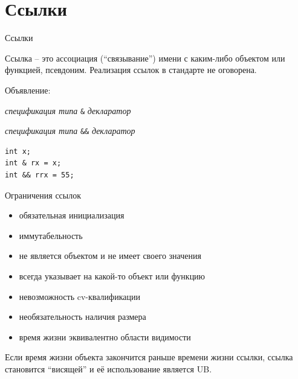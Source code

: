 \documentclass[unknownkeysallowed,xcolor=table]{beamer}
\begin{document}

\section{Ссылки}

\begin{frame}[fragile]{Ссылки}

Ссылка -- это ассоциация (``связывание'') имени с каким-либо объектом или функцией, псевдоним.
Реализация ссылок в стандарте не оговорена.

\vspace{2em}

Объявление:

\vspace{0.7em}

\emph{спецификация типа} \lstinline{&} \emph{декларатор}

\vspace{0.5em}

\emph{спецификация типа} \lstinline{&&} \emph{декларатор}

\vspace{1em}

\begin{lstlisting}
int x;
int & rx = x;
int && rrx = 55;
\end{lstlisting}

\end{frame}

\begin{frame}[fragile]{Ограничения ссылок}

\begin{itemize}
  \item обязательная инициализация \vspace{0.5em}
  \item иммутабельность \vspace{0.5em}
  \item не является объектом и не имеет своего значения \vspace{0.5em}
  \item всегда указывает на какой-то объект или функцию \vspace{0.5em}
  \item невозможность cv-квалификации \vspace{0.5em}
  \item необязательность наличия размера \vspace{0.5em}
  \item время жизни эквивалентно области видимости
\end{itemize}

\vspace{0.5em}

Если время жизни объекта закончится раньше времени жизни ссылки, ссылка становится ``висящей'' и её использование является UB.

\end{frame}
\end{document}
